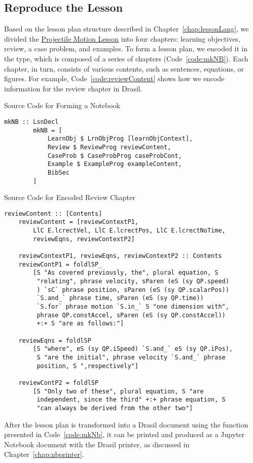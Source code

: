 \subsection{Reproduce the Lesson}
Based on the lesson plan structure described in Chapter~\ref{chap:lessonLang}, 
we divided the 
\href{https://github.com/smiths/caseStudies/blob/master/CaseStudies/projectile/projectileLesson/orgModeVersion/projMotLesson.pdf}{Projectile
 Motion Lesson} into four chapters: learning objectives, review, a case 
problem, and examples. To form a lesson plan, we encoded it in the 
 type, which is composed of a series of chapters 
(Code~\ref{code:mkNB}). Each chapter, in turn, consists of various contents, 
such as sentences, equations, or figures. For example, 
Code~\ref{code:reviewContent} 
shows how we encode information for the review chapter in Drasil.

\begin{listing}[h]
	\caption{Source Code for Forming a Notebook} 
	\label{code:mkNB}
	\begin{lstlisting}[language=haskell1]				
		mkNB :: LsnDecl
		mkNB = [
			LearnObj $ LrnObjProg [learnObjContext],
			Review $ ReviewProg reviewContent,
			CaseProb $ CaseProbProg caseProbCont,
			Example $ ExampleProg exampleContent,
			BibSec
		]
	\end{lstlisting}
\end{listing}

\begin{listing}[h]
	\caption{Source Code for Encoded Review Chapter} 
	\label{code:reviewContent}
	\begin{lstlisting}[language=haskell1]	
	reviewContent :: [Contents]
	reviewContent = [reviewContextP1, 
		LlC E.lcrectVel, LlC E.lcrectPos, LlC E.lcrectNoTime, 
		reviewEqns, reviewContextP2]
		
	reviewContextP1, reviewEqns, reviewContextP2 :: Contents
	reviewContP1 = foldlSP_
		[S "As covered previously, the", plural equation, S 
	 	 "relating", phrase velocity, sParen (eS (sy QP.speed)
	 	 ) `sC` phrase position, sParen (eS (sy QP.scalarPos)) 
	 	 `S.and_` phrase time, sParen (eS (sy QP.time)) 
	 	 `S.for` phrase motion `S.in_` S "one dimension with",
	 	 phrase QP.constAccel, sParen (eS (sy QP.constAccel)) 
	 	 +:+ S "are as follows:"]
		
	reviewEqns = foldlSP 
		[S "where", eS (sy QP.iSpeed) `S.and_` eS (sy QP.iPos), 
	 	 S "are the initial", phrase velocity `S.and_` phrase 
		 position, S ",respectively"]
		
	reviewContP2 = foldlSP 
		[S "Only two of these", plural equation, S "are 
	 	 independent, since the third" +:+ phrase equation, S 
	 	 "can always be derived from the other two"]
	\end{lstlisting}
\end{listing}

After the lesson plan is transformed into a Drasil document using the 
 function presented in Code~\ref{code:mkNb}, it can be printed and 
produced as a Jupyter Notebook document with the Drasil printer, as discussed 
in Chapter~\ref{chap:nbprinter}.


